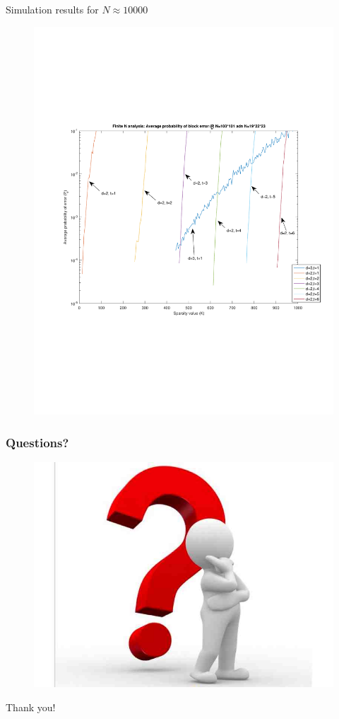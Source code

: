 \documentclass[10pt,xcolor=table]{beamer}
\begin{document}
	\begin{frame}{Simulation results for $N \approx 10000$}
		\begin{figure}[t]
			\centering
			\includegraphics[width=3.9 in]{./Figures/Finite_N_analysis_block}
		\end{figure}
		
	\end{frame}
	
	\begin{frame}\frametitle{Questions?}
		\begin{figure}[t]
			\centering
			\includegraphics[width=2.8 in]{./Figures/questions}
		\end{figure}
		\centering
		\color{blue}
		\Huge{Thank you!}
	\end{frame}
\end{document}
